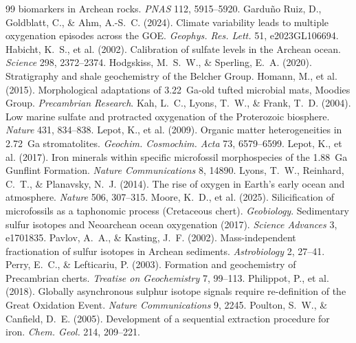 \documentclass[11pt]{article}
\begin{document}
\begin{thebibliography}{99}
biomarkers in Archean rocks. \textit{PNAS} 112, 5915--5920.
 Gardu\~{n}o Ruiz, D., Goldblatt, C., \& Ahm,
A.-S.~C. (2024). Climate variability leads to multiple oxygenation episodes across the GOE.
\textit{Geophys. Res. Lett.} 51, e2023GL106694.
 Habicht, K.~S., et al. (2002). Calibration of sulfate
levels in the Archean ocean. \textit{Science} 298, 2372--2374.
 Hodgskiss, M.~S.~W., \& Sperling, E.~A. (2020).
Stratigraphy and shale geochemistry of the Belcher Group.
 Homann, M., et al. (2015). Morphological adaptations of
3.22~Ga-old tufted microbial mats, Moodies Group. \textit{Precambrian Research}.
 Kah, L.~C., Lyons, T.~W., \& Frank, T.~D. (2004). Low marine
sulfate and protracted oxygenation of the Proterozoic biosphere. \textit{Nature} 431, 834--838.
 Lepot, K., et al. (2009). Organic matter heterogeneities in
2.72~Ga stromatolites. \textit{Geochim. Cosmochim. Acta} 73, 6579--6599.
 Lepot, K., et al. (2017). Iron minerals within specific
microfossil morphospecies of the 1.88~Ga Gunflint Formation. \textit{Nature Communications} 8, 14890.
 Lyons, T.~W., Reinhard, C.~T., \& Planavsky, N.~J. (2014).
The rise of oxygen in Earth's early ocean and atmosphere. \textit{Nature} 506, 307--315.
 Moore, K.~D., et al. (2025). Silicification of microfossils
as a taphonomic process (Cretaceous chert). \textit{Geobiology}.
 Sedimentary sulfur isotopes and Neoarchean ocean
oxygenation (2017). \textit{Science Advances} 3, e1701835.
 Pavlov, A.~A., \& Kasting, J.~F. (2002).
Mass-independent fractionation of sulfur isotopes in Archean sediments. \textit{Astrobiology} 2, 27--41.
 Perry, E.~C., \& Lefticariu, P. (2003). Formation and
geochemistry of Precambrian cherts. \textit{Treatise on Geochemistry} 7, 99--113.
 Philippot, P., et al. (2018). Globally asynchronous
sulphur isotope signals require re-definition of the Great Oxidation Event. \textit{Nature
Communications} 9, 2245.
 Poulton, S.~W., \& Canfield, D.~E. (2005).
Development of a sequential extraction procedure for iron. \textit{Chem. Geol.} 214, 209--221.

\end{thebibliography}
\end{document}
